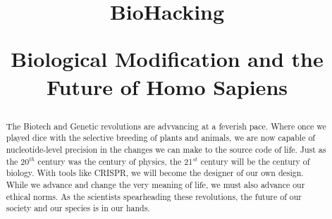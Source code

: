 \documentclass{article}
\title{BioHacking \\
\begin{large} 
    Biological Modification and the Future of Homo Sapiens
\end{large} }	%
\begin{document}
\maketitlepage
\newpage


\begin{abstract}
    The Biotech and Genetic revolutions are advvancing at a feverish pace.
    Where once we played dice with the selective breeding of plants and animals, we are now capable of nucleotide-level precision in the changes we can make to the source code of life.
    Just as the 20$^{th}$ century was the century of physics, the 21$^{st}$ century will be the century of biology.
    With tools like CRISPR, we will become the designer of our own design.
    While we advance and change the very meaning of life, we must also advance our ethical norms.
    As the scientists spearheading these revolutions, the future of our society and our species is in our hands.
\end{abstract}
\newpage

\makeheader	%
\maketitle	%






\newpage
\makeworkscited
\end{document}

